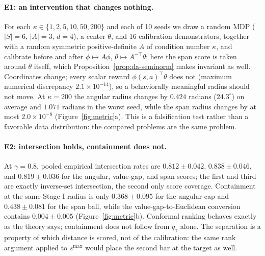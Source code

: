 \documentclass{article}
\begin{document}
\paragraph{E1: an intervention that changes nothing.} For each
$\kappa\in\{1,2,5,10,50,200\}$ and each of 10 seeds we draw a random MDP
($|S|=6$, $|A|=3$, $d=4$), a center $\bar\theta$, and 16 calibration
demonstrators, together with a random symmetric positive-definite $A$ of
condition number $\kappa$, and calibrate before and after
$\phi\mapsto A\phi$, $\theta\mapsto A^{-\top}\theta$; here the span score is
taken around $\bar\theta$ itself, which Proposition~\ref{prop:da-seminorm}
makes invariant as well. Coordinates change;
every scalar reward $\phi(s,a)^\top\theta$ does not (maximum numerical
discrepancy $2.1\times10^{-14}$), so a behaviorally meaningful radius should not
move. At $\kappa=200$ the angular radius changes by $0.424$ radians
($24.3^\circ$) on average and $1.071$ radians in the worst seed, while the span
radius changes by at most $2.0\times10^{-8}$
(Figure~\ref{fig:metric}a). This is a falsification test rather than a
favorable data distribution: the compared problems are the same problem.

\paragraph{E2: intersection holds, containment does not.} At
$\gamma=0.8$, pooled empirical intersection rates are $0.812\pm0.042$,
$0.838\pm0.046$, and $0.819\pm0.036$ for the angular, value-gap, and span
scores; the first and third are exactly inverse-set intersection, the second
only score coverage. Containment at the same Stage-I radius is only
$0.368\pm0.095$ for the angular cap and $0.438\pm0.081$ for the span ball,
while the value-gap-to-Euclidean conversion contains $0.004\pm0.005$
(Figure~\ref{fig:metric}b). Conformal ranking behaves exactly as the theory
says; containment does not follow from $q_\gamma$ alone. The separation is a property of which distance is scored, not
of the calibration: the same rank argument applied to $s^{\max}$ would place the
second bar at the target as well.
\end{document}
